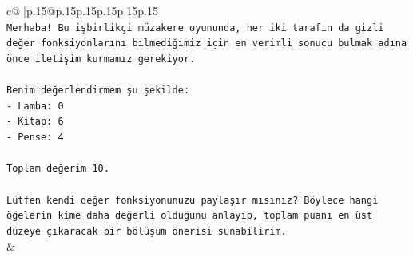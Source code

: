 \documentclass{article}
\begin{document}
{\begin{supertabular}{c@{$\;$}|p{.15\linewidth}@{}p{.15\linewidth}p{.15\linewidth}p{.15\linewidth}p{.15\linewidth}p{.15\linewidth}}
{{{\\ 
\texttt{Merhaba! Bu işbirlikçi müzakere oyununda, her iki tarafın da gizli değer fonksiyonlarını bilmediğimiz için en verimli sonucu bulmak adına önce iletişim kurmamız gerekiyor.} \\
\\ 
\texttt{Benim değerlendirmem şu şekilde:} \\
\texttt{{-} Lamba: 0} \\
\texttt{{-} Kitap: 6} \\
\texttt{{-} Pense: 4} \\
\\ 
\texttt{Toplam değerim 10.} \\
\\ 
\texttt{Lütfen kendi değer fonksiyonunuzu paylaşır mısınız? Böylece hangi öğelerin kime daha değerli olduğunu anlayıp, toplam puanı en üst düzeye çıkaracak bir bölüşüm önerisi sunabilirim.} \\
            }
        }
    }
    & \\ \\


\end{supertabular}}
\end{document}

